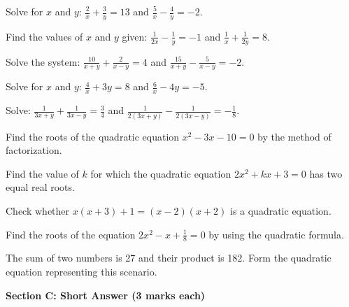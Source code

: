 \documentclass[12pt,a4paper]{exam}
\begin{document}
\begin{questions}
\question[2] Solve for $x$ and $y$: $\frac{2}{x} + \frac{3}{y} = 13$ and $\frac{5}{x} - \frac{4}{y} = -2$.
\vspace{0.15cm}

\question[2] Find the values of $x$ and $y$ given: $\frac{1}{2x} - \frac{1}{y} = -1$ and $\frac{1}{x} + \frac{1}{2y} = 8$.
\vspace{0.15cm}

\question[2] Solve the system: $\frac{10}{x+y} + \frac{2}{x-y} = 4$ and $\frac{15}{x+y} - \frac{5}{x-y} = -2$.
\vspace{0.15cm}

\question[2] Solve for $x$ and $y$: $\frac{4}{x} + 3y = 8$ and $\frac{6}{x} - 4y = -5$.
\vspace{0.15cm}

\question[2] Solve: $\frac{1}{3x+y} + \frac{1}{3x-y} = \frac{3}{4}$ and $\frac{1}{2(3x+y)} - \frac{1}{2(3x-y)} = -\frac{1}{8}$.
\vspace{0.15cm}

\question[2] Find the roots of the quadratic equation $x^2 - 3x - 10 = 0$ by the method of factorization.
\vspace{0.15cm}

\question[2] Find the value of $k$ for which the quadratic equation $2x^2 + kx + 3 = 0$ has two equal real roots.
\vspace{0.15cm}

\question[2] Check whether $x(x + 3) + 1 = (x - 2)(x + 2)$ is a quadratic equation.
\vspace{0.15cm}

\question[2] Find the roots of the equation $2x^2 - x + \frac{1}{8} = 0$ by using the quadratic formula.
\vspace{0.15cm}

\question[2] The sum of two numbers is 27 and their product is 182. Form the quadratic equation representing this scenario.
\vspace{0.15cm}

\end{questions}
\bigskip
\noindent\textbf{\large Section C: Short Answer (3 marks each)}
\end{document}
